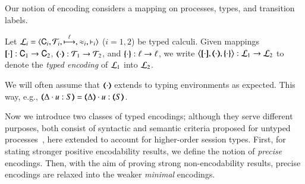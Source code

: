 \noi Our notion of encoding considers a mapping on processes, 
types, and transition labels.  

\begin{definition}\rm
        Let  $\mathcal{L}_i=\langle \mathsf{C}_i, {\cal{T}}_i, \stackrel{\ell}{\longmapsto}, \approx_i, \vdash_i \rangle$
        ($i=1,2$) be typed calculi. 
	Given mappings $[\!\![\cdot]\!\!]: \mathsf{C}_1 \to \mathsf{C}_2$, 
	$(\!\!\langle\cdot\rangle\!\!): {\cal{T}}_1 \to {\cal{T}}_2$, and 
	$\{\!\!\{\cdot\}\!\!\}: \ell \to \ell$, 
	we write 
	$\enco{\map{\cdot}, \mapt{\cdot}, \mapa{\cdot}} : \tyl{L}_1 \to \tyl{L}_2$ to denote the \emph{typed encoding} of $\mathcal{L}_1$ into $\mathcal{L}_2$.
\end{definition}

\smallskip 


%


\noi We will often assume that  $(\!\!\langle\cdot\rangle\!\!)$ extends to typing
environments as expected. This way, e.g., $\mapt{\Delta \cat u:S} = \mapt{\Delta} \cat u:\mapt{S}$.

Now we introduce two classes of typed encodings; 
although they serve different purposes, both  consist of syntactic and semantic criteria 
proposed for untyped processes~\cite{Palamidessi03,DBLP:journals/iandc/Gorla10,DBLP:conf/icalp/LanesePSS10}, here extended to account for higher-order session types.
First, for stating stronger positive encodability results, 
we define the notion of {\em precise} encodings.
Then, 
with the aim of proving strong non-encodability results, 
precise encodings are relaxed into the weaker {\em minimal} encodings. 

